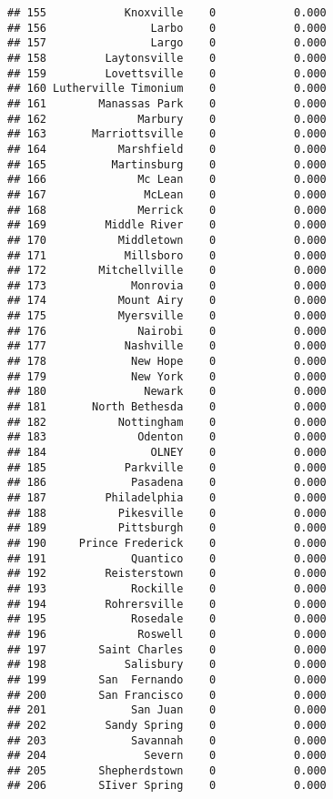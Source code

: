 \documentclass[]{article}
\begin{document}
\begin{verbatim}
## 155            Knoxville    0            0.000
## 156                Larbo    0            0.000
## 157                Largo    0            0.000
## 158         Laytonsville    0            0.000
## 159         Lovettsville    0            0.000
## 160 Lutherville Timonium    0            0.000
## 161        Manassas Park    0            0.000
## 162              Marbury    0            0.000
## 163       Marriottsville    0            0.000
## 164           Marshfield    0            0.000
## 165          Martinsburg    0            0.000
## 166              Mc Lean    0            0.000
## 167               McLean    0            0.000
## 168              Merrick    0            0.000
## 169         Middle River    0            0.000
## 170           Middletown    0            0.000
## 171            Millsboro    0            0.000
## 172        Mitchellville    0            0.000
## 173             Monrovia    0            0.000
## 174           Mount Airy    0            0.000
## 175           Myersville    0            0.000
## 176              Nairobi    0            0.000
## 177            Nashville    0            0.000
## 178             New Hope    0            0.000
## 179             New York    0            0.000
## 180               Newark    0            0.000
## 181       North Bethesda    0            0.000
## 182           Nottingham    0            0.000
## 183              Odenton    0            0.000
## 184                OLNEY    0            0.000
## 185            Parkville    0            0.000
## 186             Pasadena    0            0.000
## 187         Philadelphia    0            0.000
## 188           Pikesville    0            0.000
## 189           Pittsburgh    0            0.000
## 190     Prince Frederick    0            0.000
## 191             Quantico    0            0.000
## 192         Reisterstown    0            0.000
## 193             Rockille    0            0.000
## 194         Rohrersville    0            0.000
## 195             Rosedale    0            0.000
## 196              Roswell    0            0.000
## 197        Saint Charles    0            0.000
## 198            Salisbury    0            0.000
## 199        San  Fernando    0            0.000
## 200        San Francisco    0            0.000
## 201             San Juan    0            0.000
## 202         Sandy Spring    0            0.000
## 203             Savannah    0            0.000
## 204               Severn    0            0.000
## 205        Shepherdstown    0            0.000
## 206        SIiver Spring    0            0.000

\end{verbatim}
\end{document}
